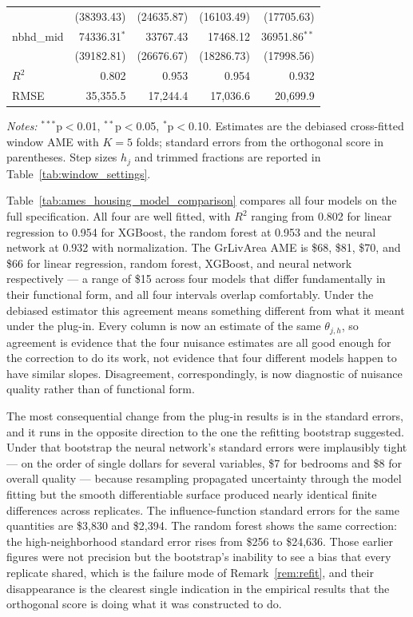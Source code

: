 \documentclass[12pt]{article}
\begin{document}
\begin{table}[htbp]
\begin{threeparttable}
\begin{tabular}{lrrrr}
				& (38393.43) & (24635.87) & (16103.49) & (17705.63) \\
				nbhd\_mid & 74336.31$^{*}$ & 33767.43 & 17468.12 & 36951.86$^{**}$ \\
				& (39182.81) & (26676.67) & (18286.73) & (17998.56) \\
				\midrule
				$R^2$ & 0.802 & 0.953 & 0.954 & 0.932 \\
				RMSE & 35,355.5 & 17,244.4 & 17,036.6 & 20,699.9 \\
				\bottomrule
				\end{tabular}
				\begin{tablenotes}
				\footnotesize
				\item \textit{Notes:} $^{***}$p$<$0.01, $^{**}$p$<$0.05, $^{*}$p$<$0.10. Estimates are the debiased cross-fitted window AME with $K=5$ folds; standard errors from the orthogonal score in parentheses. Step sizes $h_j$ and trimmed fractions are reported in Table~\ref{tab:window_settings}.
				\end{tablenotes}
		\end{threeparttable}
	\end{table}
	
	Table~\ref{tab:ames_housing_model_comparison} compares all four models on the full specification. All four are well fitted, with $R^2$ ranging from 0.802 for linear regression to 0.954 for XGBoost, the random forest at 0.953 and the neural network at 0.932 with normalization. The GrLivArea AME is \$68, \$81, \$70, and \$66 for linear regression, random forest, XGBoost, and neural network respectively --- a range of \$15 across four models that differ fundamentally in their functional form, and all four intervals overlap comfortably. Under the debiased estimator this agreement means something different from what it meant under the plug-in. Every column is now an estimate of the same $\theta_{j,h}$, so agreement is evidence that the four nuisance estimates are all good enough for the correction to do its work, not evidence that four different models happen to have similar slopes. Disagreement, correspondingly, is now diagnostic of nuisance quality rather than of functional form.

	The most consequential change from the plug-in results is in the standard errors, and it runs in the opposite direction to the one the refitting bootstrap suggested. Under that bootstrap the neural network's standard errors were implausibly tight --- on the order of single dollars for several variables, \$7 for bedrooms and \$8 for overall quality --- because resampling propagated uncertainty through the model fitting but the smooth differentiable surface produced nearly identical finite differences across replicates. The influence-function standard errors for the same quantities are \$3,830 and \$2,394. The random forest shows the same correction: the high-neighborhood standard error rises from \$256 to \$24,636. Those earlier figures were not precision but the bootstrap's inability to see a bias that every replicate shared, which is the failure mode of Remark~\ref{rem:refit}, and their disappearance is the clearest single indication in the empirical results that the orthogonal score is doing what it was constructed to do.
\end{document}
